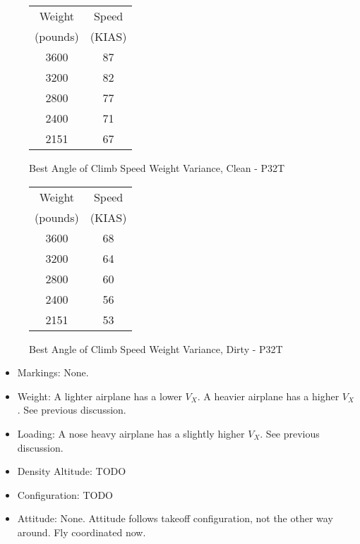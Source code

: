 \begin{figure}
\begin{center}
\begin{tabular}{ |c|c| }
    \hline
    Weight & Speed \\
    (pounds) & (KIAS) \\
    \hline
     3600 &  87 \\
     3200 &  82 \\
    \hline
     2800 &  77 \\
     2400 &  71 \\
    \hline
     2151 &  67 \\
    \hline
\end{tabular}
\end{center}
\caption{Best Angle of Climb Speed Weight Variance, Clean - P32T}
\label{fig:VXCleanP32T}
\end{figure}

\begin{figure}
\begin{center}
\begin{tabular}{ |c|c| }
    \hline
    Weight & Speed \\
    (pounds) & (KIAS) \\
    \hline
     3600 &  68 \\
     3200 &  64 \\
    \hline
     2800 &  60 \\
     2400 &  56 \\
    \hline
     2151 &  53 \\
    \hline
\end{tabular}
\end{center}
\caption{Best Angle of Climb Speed Weight Variance, Dirty - P32T}
\label{fig:VXDirtyP32T}
\end{figure}

\begin{itemize}
\item Markings: None.
\item Weight: A lighter airplane has a lower $V_X$. A heavier airplane has a higher $V_X$. See previous discussion.
\item Loading: A nose heavy airplane has a slightly higher $V_X$. See previous discussion.
\item Density Altitude: TODO
\item Configuration: TODO
\item Attitude: None. Attitude follows takeoff configuration, not the other way around. Fly coordinated now.
\end{itemize}

